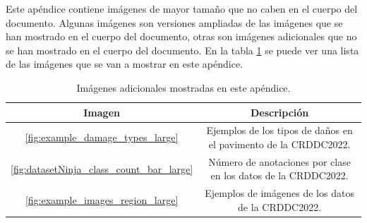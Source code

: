 
Este apéndice contiene imágenes de mayor tamaño que no caben en el cuerpo del documento. Algunas imágenes son versiones ampliadas de las imágenes que se han mostrado en el cuerpo del documento, otras son imágenes adicionales que no se han mostrado en el cuerpo del documento. En la tabla \ref{tab:larger_images} se puede ver una lista de las imágenes que se van a mostrar en este apéndice.

\begin{table}[H]
    \centering
    \begin{tabular}{|c|c|}
        \hline
        \textbf{Imagen} & \textbf{Descripción} \\ \hline
        \ref{fig:example_damage_types_large} & Ejemplos de los tipos de daños en el pavimento de la CRDDC2022. \\ \hline
        \ref{fig:datasetNinja_class_count_bar_large} & Número de anotaciones por clase en los datos de la CRDDC2022. \\ \hline
        \ref{fig:example_images_region_large} & Ejemplos de imágenes de los datos de la CRDDC2022. \\ \hline
    \end{tabular}
    \caption{Imágenes adicionales mostradas en este apéndice.}
    \label{tab:larger_images}
\end{table}

